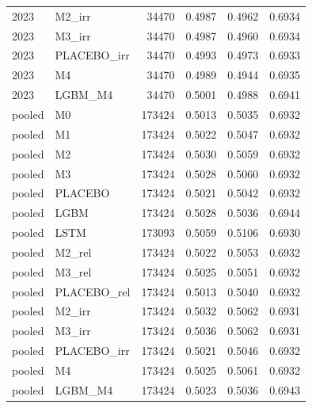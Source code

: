 \begin{tabular}{llrrrr}
2023 & M2\_irr & 34470 & 0.4987 & 0.4962 & 0.6934 \\
2023 & M3\_irr & 34470 & 0.4987 & 0.4960 & 0.6934 \\
2023 & PLACEBO\_irr & 34470 & 0.4993 & 0.4973 & 0.6933 \\
2023 & M4 & 34470 & 0.4989 & 0.4944 & 0.6935 \\
2023 & LGBM\_M4 & 34470 & 0.5001 & 0.4988 & 0.6941 \\
pooled & M0 & 173424 & 0.5013 & 0.5035 & 0.6932 \\
pooled & M1 & 173424 & 0.5022 & 0.5047 & 0.6932 \\
pooled & M2 & 173424 & 0.5030 & 0.5059 & 0.6932 \\
pooled & M3 & 173424 & 0.5028 & 0.5060 & 0.6932 \\
pooled & PLACEBO & 173424 & 0.5021 & 0.5042 & 0.6932 \\
pooled & LGBM & 173424 & 0.5028 & 0.5036 & 0.6944 \\
pooled & LSTM & 173093 & 0.5059 & 0.5106 & 0.6930 \\
pooled & M2\_rel & 173424 & 0.5022 & 0.5053 & 0.6932 \\
pooled & M3\_rel & 173424 & 0.5025 & 0.5051 & 0.6932 \\
pooled & PLACEBO\_rel & 173424 & 0.5013 & 0.5040 & 0.6932 \\
pooled & M2\_irr & 173424 & 0.5032 & 0.5062 & 0.6931 \\
pooled & M3\_irr & 173424 & 0.5036 & 0.5062 & 0.6931 \\
pooled & PLACEBO\_irr & 173424 & 0.5021 & 0.5046 & 0.6932 \\
pooled & M4 & 173424 & 0.5025 & 0.5061 & 0.6932 \\
pooled & LGBM\_M4 & 173424 & 0.5023 & 0.5036 & 0.6943 \\
\bottomrule
\end{tabular}
